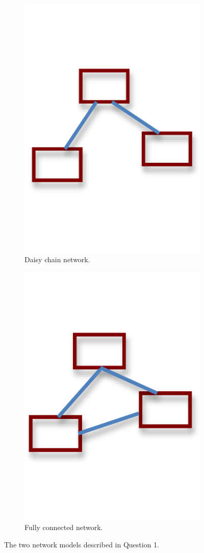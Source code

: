 \documentclass[12pt]{article}
\begin{document}
\begin{figure}
\begin{subfigure}{.5\textwidth}
\centering
\includegraphics[width=.5\textwidth]{daisychain.pdf}
\caption{Daisy chain network.}
\end{subfigure}
\begin{subfigure}{0.5\textwidth}
\centering
\includegraphics[width=.5\textwidth]{fullyconnected.pdf}
\caption{Fully connected network.}
\end{subfigure}
\caption{The two network models described in Question 1.}
\label{fig:networks}
\end{figure}
\end{document}

